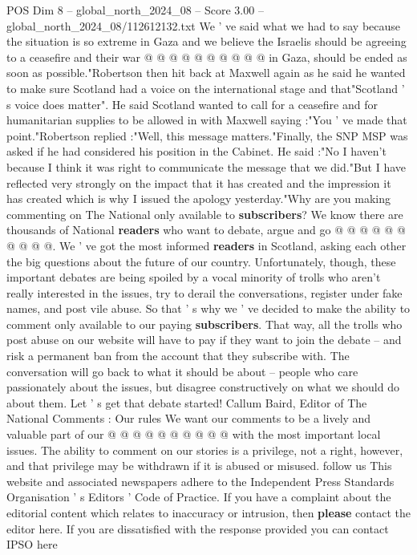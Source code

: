 \begin{textsample}{POS Dim 8 – global\_north\_2024\_08 – Score 3.00 – global\_north\_2024\_08/112612132.txt}
We ' ve said what we had to say because the situation is so extreme in Gaza and we believe the Israelis should be agreeing to a ceasefire and their war @ @ @ @ @ @ @ @ @ @ in Gaza, should be ended as soon as possible."Robertson then hit back at Maxwell again as he said he wanted to make sure Scotland had a voice on the international stage and that"Scotland ' s voice does matter".
He said Scotland wanted to call for a ceasefire and for humanitarian supplies to be allowed in with Maxwell saying :"You ' ve made that point."Robertson replied :"Well, this message matters."Finally, the SNP MSP was asked if he had considered his position in the Cabinet.
He said :"No I haven't because I think it was right to communicate the message that we did."But I have reflected very strongly on the impact that it has created and the impression it has created which is why I issued the apology yesterday."Why are you making commenting on The National only available to \textbf{subscribers}?
We know there are thousands of National \textbf{readers} who want to debate, argue and go @ @ @ @ @ @ @ @ @ @.
We ' ve got the most informed \textbf{readers} in Scotland, asking each other the big questions about the future of our country.
Unfortunately, though, these important debates are being spoiled by a vocal minority of trolls who aren't really interested in the issues, try to derail the conversations, register under fake names, and post vile abuse.
So that ' s why we ' ve decided to make the ability to comment only available to our paying \textbf{subscribers}.
That way, all the trolls who post abuse on our website will have to pay if they want to join the debate -- and risk a permanent ban from the account that they subscribe with.
The conversation will go back to what it should be about -- people who care passionately about the issues, but disagree constructively on what we should do about them.
Let ' s get that debate started!
Callum Baird, Editor of The National Comments : Our rules We want our comments to be a lively and valuable part of our @ @ @ @ @ @ @ @ @ @ with the most important local issues.
The ability to comment on our stories is a privilege, not a right, however, and that privilege may be withdrawn if it is abused or misused. follow us This website and associated newspapers adhere to the Independent Press Standards Organisation ' s Editors ' Code of Practice.
If you have a complaint about the editorial content which relates to inaccuracy or intrusion, then \textbf{please} contact the editor here.
If you are dissatisfied with the response provided you can contact IPSO here

\end{textsample}

